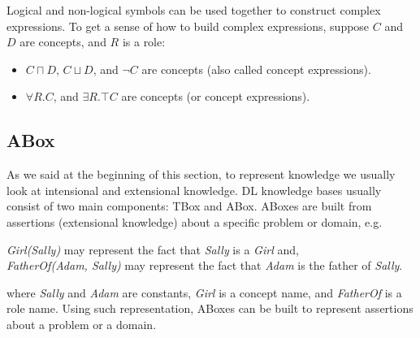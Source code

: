 Logical and non-logical symbols can be used together to construct complex expressions. To get a sense of how to build complex expressions, suppose $C$ and $D$ are concepts, and $R$ is a role:
\begin{itemize}
\item $C \sqcap D$, $C \sqcup D$, and $\neg C$ are concepts (also called concept expressions).
\item $\forall R.C$, and $\exists R.\top C$ are concepts (or concept expressions).
\end{itemize}


\subsection{ABox}
As we said at the beginning of this section, to represent knowledge we usually look at intensional and extensional knowledge. DL knowledge bases usually consist of two main components: TBox and ABox. ABoxes are built from assertions (extensional knowledge) about a specific problem or domain, e.g.
\begin{center}
\textit{Girl(Sally)} may represent the fact that \textit{Sally} is a \textit{Girl} and, \\
\textit{FatherOf(Adam, Sally)} may represent the fact that \textit{Adam} is the father of \textit{Sally}.
\end{center} 
where \textit{Sally} and \textit{Adam} are constants, \textit{Girl} is a concept name, and \textit{FatherOf} is a role name. Using such representation, ABoxes can be built to represent assertions about a problem or a domain.


